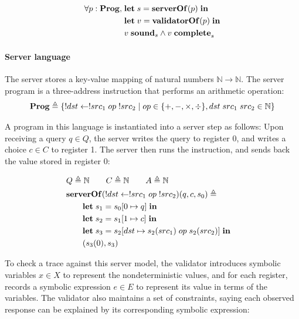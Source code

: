 \documentclass{article}
\theoremstyle{definition}
\newcommand{\Let}{\ottkw{let}\;}
\newcommand{\In}{\;\ottkw{in}}
\newcommand{\letin}[2]{\Let#1=#2\In}
\newcommand{\sound}{\ottkw{sound}}
\newcommand{\issound}[2]{#1\;\sound_{#2}}
\newcommand{\complete}{\ottkw{complete}}
\newcommand{\iscomplete}[2]{#1\;\complete_{#2}}
\newcommand{\Prog}{\ottkw{Prog}}
\newcommand{\serverOf}{\ottkw{serverOf}}
\newcommand{\validatorOf}{\ottkw{validatorOf}}
\begin{document}
\begin{align*}
  \forall p:\Prog,\;&\letin{s}{\serverOf(p)}\\
  &\letin{v}{\validatorOf(p)}\\
  &\issound{v}{s}\wedge\iscomplete{v}{s}
\end{align*}

\paragraph{Server language}
The server stores a key-value mapping of natural numbers $\mathbb N\to\mathbb
N$.  The server program is a three-address instruction that performs an
arithmetic operation:
\[\Prog \triangleq \{!dst\gets !src_1\;op\;!src_2\mid op\in\{+,-,\times,\div\},
dst\;src_1\;src_2\in\mathbb N\}\]

A program in this language is instantiated into a server step as follows: Upon
receiving a query $q\in Q$, the server writes the query to register 0, and
writes a choice $c\in C$ to register 1.  The server then runs the instruction,
and sends back the value stored in register 0:

\begin{align*}
  \rlap{$Q\triangleq\mathbb N\qquad C\triangleq\mathbb N\qquad A\triangleq\mathbb N$}\\
  \rlap{$\serverOf(!dst\gets !src_1\;op\;!src_2)(q,c,s_0)\triangleq$}\\
  &\qquad\letin{s_1}{s_0 [0\mapsto q]}\\
  &\qquad\letin{s_2}{s_1 [1\mapsto c]}\\
  &\qquad\letin{s_3}{s_2 [dst\mapsto s_2(src_1)\;op\;s_2(src_2)]}\\
  &\qquad(s_3(0), s_3)
\end{align*}

To check a trace against this server model, the validator introduces symbolic
variables $x\in X$ to represent the nondeterministic values, and for each
register, records a symbolic expression $e\in E$ to represent its value in terms
of the variables.  The validator also maintains a set of constraints, saying
each observed response can be explained by its corresponding symbolic
expression:
\end{document}

